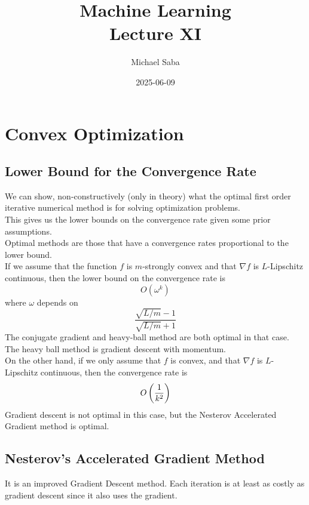 \documentclass[12pt]{article}
\title{%
    \Huge Machine Learning \\
    \Large Lecture XI
}
\date{2025-06-09}
\author{Michael Saba}
\begin{document}
\maketitle
\newpage
\setlength{\parindent}{0pt}

\section*{Convex Optimization}
\subsection*{Lower Bound for the Convergence Rate}

We can show, non-constructively (only in theory)
what the optimal first order iterative
numerical method is for solving
optimization problems. \\

This gives us the lower bounds on the
convergence rate given some prior assumptions. \\

Optimal methods are those that have a convergence
rates proportional to the lower bound. \\

If we assume that the function $f$
is $m$-strongly convex and that $\nabla f$
is $L$-Lipschitz continuous,
then the lower bound on the convergence 
rate is 
\[ O(\omega^k)\] 
where $\omega$ depends on 
\[ \dfrac{\sqrt{L/m} - 1}{\sqrt{L/m} + 1} \]
The conjugate gradient and heavy-ball method
are both optimal in that case. \\

The heavy ball method is gradient descent 
with momentum. \\

On the other hand, if we only assume that $f$
is convex, and that $\nabla f$
is $L$-Lipschitz continuous,
then the convergence rate is 
\[ O\left( \dfrac{1}{k^2} \right) \]
Gradient descent is not optimal in this case,
but the Nesterov Accelerated Gradient method
is optimal. \\

\newpage

\subsection*{Nesterov's Accelerated Gradient
Method}

It is an improved Gradient Descent method.
Each iteration is at least as costly 
as gradient descent
since it also uses the gradient. \\
\end{document}
